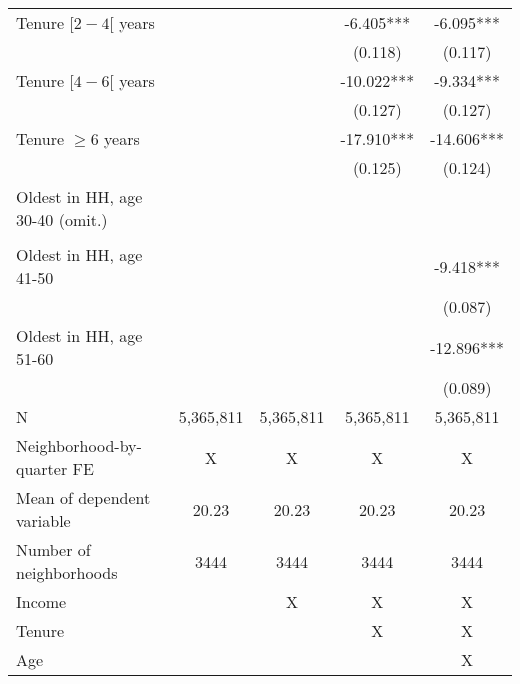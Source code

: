 \begin{tabular}{lcccc}
Tenure $[2-4[$ years &  &  & -6.405*** & -6.095*** \\ 
 &  &  & (0.118) & (0.117) \\ 
Tenure $[4-6[$ years &  &  & -10.022*** & -9.334*** \\ 
 &  &  & (0.127) & (0.127) \\ 
Tenure $\geq 6$ years &  &  & -17.910*** & -14.606*** \\ 
 &  &  & (0.125) & (0.124) \\ 
 Oldest in HH, age 30-40 (omit.) &  &  &  &  \\ 
 &  &  &  &  \\ 
Oldest in HH, age 41-50 &  &  &  & -9.418*** \\ 
 &  &  &  & (0.087) \\ 
Oldest in HH, age 51-60 &  &  &  & -12.896*** \\ 
 &  &  &  & (0.089) \\ 
 \midrule
N & 5,365,811 & 5,365,811 & 5,365,811 & 5,365,811 \\ 
Neighborhood-by-quarter FE & X & X & X & X \\ 
Mean of dependent variable & 20.23 & 20.23 & 20.23 & 20.23 \\ 
Number of neighborhoods & 3444 & 3444 & 3444 & 3444 \\ 
Income &  & X & X & X \\ 
Tenure &  &  & X & X \\ 
Age &  &  &  & X \\ 
\bottomrule
\end{tabular}